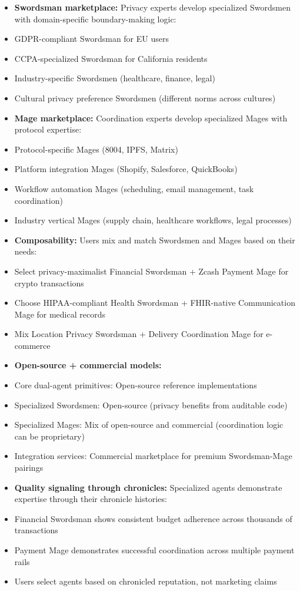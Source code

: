 \documentclass[
  11pt,
]{article}
\begin{document}
\begin{itemize}
\item
  \textbf{Swordsman marketplace:} Privacy experts develop specialized
  Swordsmen with domain-specific boundary-making logic:
\item
  GDPR-compliant Swordsman for EU users
\item
  CCPA-specialized Swordsman for California residents
\item
  Industry-specific Swordsmen (healthcare, finance, legal)
\item
  Cultural privacy preference Swordsmen (different norms across
  cultures)
\item
  \textbf{Mage marketplace:} Coordination experts develop specialized
  Mages with protocol expertise:
\item
  Protocol-specific Mages (8004, IPFS, Matrix)
\item
  Platform integration Mages (Shopify, Salesforce, QuickBooks)
\item
  Workflow automation Mages (scheduling, email management, task
  coordination)
\item
  Industry vertical Mages (supply chain, healthcare workflows, legal
  processes)
\item
  \textbf{Composability:} Users mix and match Swordsmen and Mages based
  on their needs:
\item
  Select privacy-maximalist Financial Swordsman + Zcash Payment Mage for
  crypto transactions
\item
  Choose HIPAA-compliant Health Swordsman + FHIR-native Communication
  Mage for medical records
\item
  Mix Location Privacy Swordsman + Delivery Coordination Mage for
  e-commerce
\item
  \textbf{Open-source + commercial models:}
\item
  Core dual-agent primitives: Open-source reference implementations
\item
  Specialized Swordsmen: Open-source (privacy benefits from auditable
  code)
\item
  Specialized Mages: Mix of open-source and commercial (coordination
  logic can be proprietary)
\item
  Integration services: Commercial marketplace for premium
  Swordsman-Mage pairings
\item
  \textbf{Quality signaling through chronicles:} Specialized agents
  demonstrate expertise through their chronicle histories:
\item
  Financial Swordsman shows consistent budget adherence across thousands
  of transactions
\item
  Payment Mage demonstrates successful coordination across multiple
  payment rails
\item
  Users select agents based on chronicled reputation, not marketing
  claims
\end{itemize}
\end{document}
